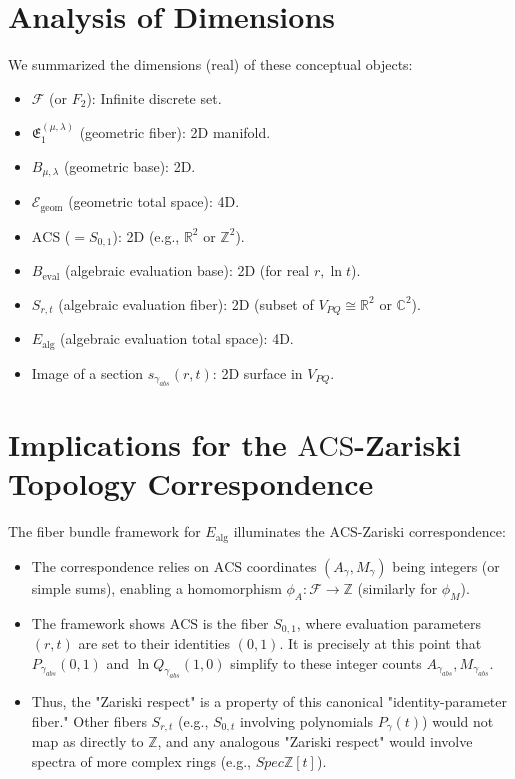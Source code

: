 \documentclass{article}[a4paper,12pt]
\begin{document}
\section{Analysis of Dimensions}
We summarized the dimensions (real) of these conceptual objects:
\begin{itemize}
    \item $\mathcal{F}$ (or $F_2$): Infinite discrete set.
    \item $\mathfrak{E}_1^{(\mu,\lambda)}$ (geometric fiber): 2D manifold.
    \item $B_{\mu,\lambda}$ (geometric base): 2D.
    \item $\mathcal{E}_{\text{geom}}$ (geometric total space): 4D.
    \item $\mathrm{ACS}$ ($=S_{0,1}$): 2D (e.g., $\mathbb{R}^2$ or $\mathbb{Z}^2$).
    \item $B_{\text{eval}}$ (algebraic evaluation base): 2D (for real $r, \ln t$).
    \item $S_{r,t}$ (algebraic evaluation fiber): 2D (subset of $V_{PQ} \cong \mathbb{R}^2$ or $\mathbb{C}^2$).
    \item $E_{\text{alg}}$ (algebraic evaluation total space): 4D.
    \item Image of a section $s_{\gamma_{abs}}(r,t)$: 2D surface in $V_{PQ}$.
\end{itemize}

\section{Implications for the $\mathrm{ACS}$-Zariski Topology Correspondence}
The fiber bundle framework for $E_{\text{alg}}$ illuminates the $\mathrm{ACS}$-Zariski correspondence:
\begin{itemize}
    \item The correspondence relies on $\mathrm{ACS}$ coordinates $(A_\gamma, M_\gamma)$ being integers (or simple sums), enabling a homomorphism $\phi_A: \mathcal{F} \to \mathbb{Z}$ (similarly for $\phi_M$).
    \item The framework shows $\mathrm{ACS}$ is the fiber $S_{0,1}$, where evaluation parameters $(r,t)$ are set to their identities $(0,1)$. It is precisely at this point that $P_{\gamma_{abs}}(0,1)$ and $\ln Q_{\gamma_{abs}}(1,0)$ simplify to these integer counts $A_{\gamma_{abs}}, M_{\gamma_{abs}}$.
    \item Thus, the "Zariski respect" is a property of this canonical "identity-parameter fiber." Other fibers $S_{r,t}$ (e.g., $S_{0,t}$ involving polynomials $P_\gamma(t)$) would not map as directly to $\mathbb{Z}$, and any analogous "Zariski respect" would involve spectra of more complex rings (e.g., $Spec \mathbb{Z}[t]$).
\end{itemize}
\end{document}
